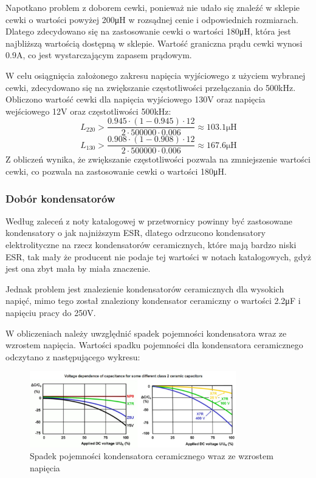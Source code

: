 \documentclass[../../main.tex]{subfiles}
\begin{document}
Napotkano problem z doborem cewki, ponieważ nie udało się znaleźć w sklepie cewki o wartości powyżej 200\si{\micro\henry} w rozsądnej cenie i odpowiednich rozmiarach.
Dlatego zdecydowano się na zastosowanie cewki o wartości 180\si{\micro\henry}, która jest najbliższą wartością dostępną w sklepie. Wartość
graniczna prądu cewki wynosi 0.9\si{\ampere}, co jest wystarczającym zapasem prądowym.

W celu osiągnięcia założonego zakresu napięcia wyjściowego z użyciem wybranej cewki, zdecydowano się na zwiększanie częstotliwości przełączania do 500\si{\kilo\hertz}.
Obliczono wartość cewki dla napięcia wyjściowego 130\si{\volt} oraz napięcia wejściowego 12\si{\volt} oraz częstotliwości 500\si{\kilo\hertz}:
\begin{equation}
    L_{220} > \frac{0.945 \cdot (1-0.945) \cdot 12}{2 \cdot 500000 \cdot 0.006} \approx 103.1\si{\micro\henry}
\end{equation}
\begin{equation}
    L_{130} > \frac{0.908 \cdot (1-0.908) \cdot 12}{2 \cdot 500000 \cdot 0.006} \approx 167.6\si{\micro\henry}
\end{equation}
Z obliczeń wynika, że zwiększanie częstotliwości pozwala na zmniejszenie wartości cewki, co pozwala na zastosowanie cewki o wartości 180\si{\micro\henry}.

\subsubsection{Dobór kondensatorów}
Według zaleceń z noty katalogowej w przetwornicy powinny być zastosowane kondensatory o jak najniższym ESR,
dlatego odrzucono kondensatory elektrolityczne na rzecz kondensatorów ceramicznych, które mają bardzo niski ESR, tak
mały że producent nie podaje tej wartości w notach katalogowych, gdyż jest ona zbyt mała by miała znaczenie.

Jednak problem jest znalezienie kondensatorów ceramicznych dla wysokich napięć, mimo tego został znaleziony kondensator 
ceramiczny o wartości 2.2\si{\micro\farad} i napięciu pracy do 250\si{\volt}.

W obliczeniach należy uwzględnić spadek pojemności kondensatora wraz ze wzrostem napięcia.
Wartości spadku pojemności dla kondensatora ceramicznego odczytano z następującego wykresu:
\begin{figure}[H]
    \centering
    \includegraphics[width=0.8\textwidth]{napiecia_c.png}
    \caption{Spadek pojemności kondensatora ceramicznego wraz ze wzrostem napięcia}
\end{figure}
\end{document}
